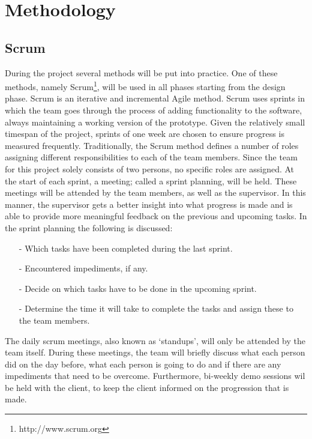 \section{Methodology}
\label{sec:meth}
\subsection{Scrum}
During the project several methods will be put into practice. One of these methods, namely Scrum\footnote{http://www.scrum.org}, will be used in all phases starting from the design phase. Scrum is an iterative and incremental Agile method. Scrum uses sprints in which the team goes through the process of adding functionality to the software, always maintaining a working version of the prototype. Given the relatively small timespan of the project, sprints of one week are chosen to ensure progress is measured frequently. Traditionally, the Scrum method defines a number of roles assigning different responsibilities to each of the team members. Since the team for this project solely consists of two persons, no specific roles are assigned. At the start of each sprint, a meeting; called a sprint planning, will be held. These meetings will be attended by the team members, as well as the supervisor. In this manner, the supervisor gets a better insight into what progress is made and is able to provide more meaningful feedback on the previous and upcoming tasks. In the sprint planning the following is discussed:
\begin{itemize}
\item[-]Which tasks have been completed during the last sprint.
\item[-]Encountered impediments, if any.
\item[-]Decide on which tasks have to be done in the upcoming sprint.
\item[-]Determine the time it will take to complete the tasks and assign these to the team members.
\end{itemize}
The daily scrum meetings, also known as `standups', will only be attended by the team itself. During these meetings, the team will briefly discuss what each person did on the day before, what each person is going to do and if there are any impediments that need to be overcome. Furthermore, bi-weekly demo sessions wil be held with the client, to keep the client informed on the progression that is made.
